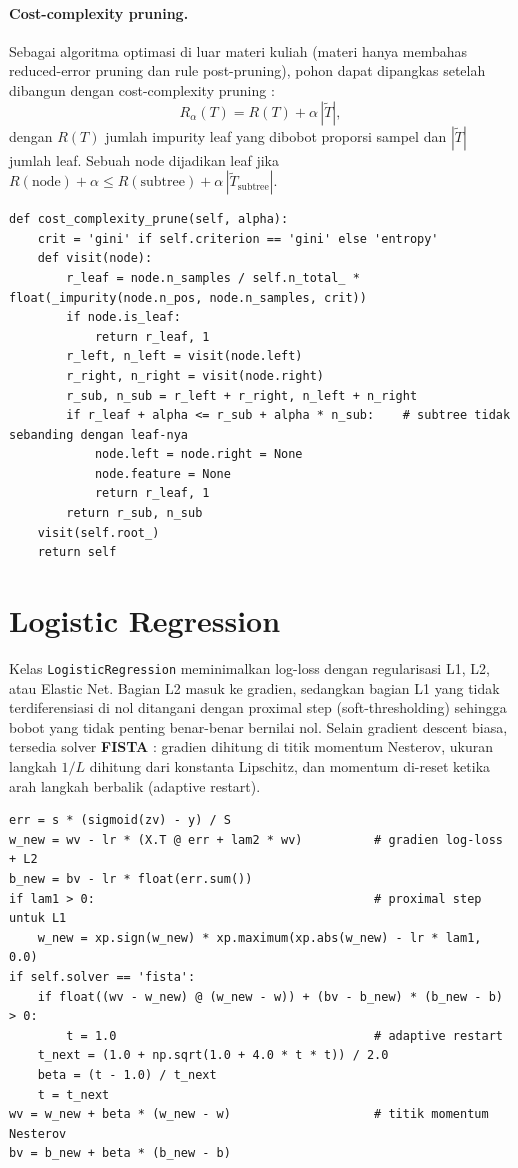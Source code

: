 \paragraph{Cost-complexity pruning.} Sebagai algoritma optimasi di luar materi kuliah (materi hanya membahas reduced-error pruning dan rule post-pruning), pohon dapat dipangkas setelah dibangun dengan cost-complexity pruning \cite{ref:breiman}:
\begin{equation}
  R_\alpha(T) = R(T) + \alpha\,|\tilde{T}|,
\end{equation}
dengan $R(T)$ jumlah impurity leaf yang dibobot proporsi sampel dan $|\tilde{T}|$ jumlah leaf. Sebuah node dijadikan leaf jika $R(\text{node})+\alpha \le R(\text{subtree})+\alpha\,|\tilde{T}_{\text{subtree}}|$.

\begin{lstlisting}[caption={Cost-complexity pruning}, label={lst:ccp}]
def cost_complexity_prune(self, alpha):
    crit = 'gini' if self.criterion == 'gini' else 'entropy'
    def visit(node):
        r_leaf = node.n_samples / self.n_total_ * float(_impurity(node.n_pos, node.n_samples, crit))
        if node.is_leaf:
            return r_leaf, 1
        r_left, n_left = visit(node.left)
        r_right, n_right = visit(node.right)
        r_sub, n_sub = r_left + r_right, n_left + n_right
        if r_leaf + alpha <= r_sub + alpha * n_sub:    # subtree tidak sebanding dengan leaf-nya
            node.left = node.right = None
            node.feature = None
            return r_leaf, 1
        return r_sub, n_sub
    visit(self.root_)
    return self
\end{lstlisting}

\section{Logistic Regression}
Kelas \texttt{LogisticRegression} meminimalkan log-loss dengan regularisasi L1, L2, atau Elastic Net. Bagian L2 masuk ke gradien, sedangkan bagian L1 yang tidak terdiferensiasi di nol ditangani dengan proximal step (soft-thresholding) sehingga bobot yang tidak penting benar-benar bernilai nol. Selain gradient descent biasa, tersedia solver \textbf{FISTA} \cite{ref:fista}: gradien dihitung di titik momentum Nesterov, ukuran langkah $1/L$ dihitung dari konstanta Lipschitz, dan momentum di-reset ketika arah langkah berbalik (adaptive restart).

\begin{lstlisting}[caption={Satu iterasi FISTA dengan proximal step L1 (diringkas)}, label={lst:fista}]
err = s * (sigmoid(zv) - y) / S
w_new = wv - lr * (X.T @ err + lam2 * wv)          # gradien log-loss + L2
b_new = bv - lr * float(err.sum())
if lam1 > 0:                                       # proximal step untuk L1
    w_new = xp.sign(w_new) * xp.maximum(xp.abs(w_new) - lr * lam1, 0.0)
if self.solver == 'fista':
    if float((wv - w_new) @ (w_new - w)) + (bv - b_new) * (b_new - b) > 0:
        t = 1.0                                    # adaptive restart
    t_next = (1.0 + np.sqrt(1.0 + 4.0 * t * t)) / 2.0
    beta = (t - 1.0) / t_next
    t = t_next
wv = w_new + beta * (w_new - w)                    # titik momentum Nesterov
bv = b_new + beta * (b_new - b)
\end{lstlisting}

